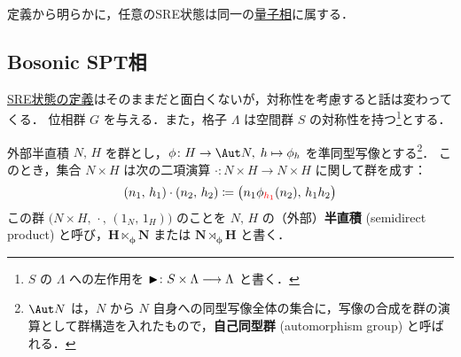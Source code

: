 \documentclass[TQFT_main]{subfiles}
\begin{document}
定義から明らかに，任意のSRE状態は同一の\hyperref[def:quantum-phase]{量子相}に属する．

\subsection{Bosonic SPT相}

\hyperref[def:SRE]{SRE状態の定義}はそのままだと面白くないが，対称性を考慮すると話は変わってくる．
位相群 $G$ を与える．また，格子 $\Lambda$ は空間群 $S$ の対称性を持つ\footnote{$S$ の $\Lambda$ への左作用を $\blacktriangleright \colon S \times \Lambda \longrightarrow \Lambda$ と書く．}とする．

\begin{mydef}[label=def:semiprod-group-inner]{外部半直積}
	$N,\, H$ を群とし，$\phi \colon H \to \Aut N,\; h \mapsto \phi_h$ を準同型写像とする\footnote{$\Aut N$ は，$N$ から $N$ 自身への同型写像全体の集合に，写像の合成を群の演算として群構造を入れたもので，\textbf{自己同型群} (automorphism group) と呼ばれる．}．
	このとき，集合 $N \times H$ は次の二項演算 $\cdot \mathrel{} \colon N\times H \to N\times H$ に関して群を成す：
	\begin{align}
		(n_1,\, h_1) \cdot (n_2,\, h_2) \coloneqq \bigl( n_1 \phi_{\textcolor{red}{h_1}}(n_2),\, h_1h_2 \bigr) 
	\end{align}
	この群 $\bigl( N \times H,\, \cdot \mathrel{},\, (1_N,\, 1_H) \bigr)$ のことを $N,\, H$ の（外部）\textbf{半直積} (semidirect product) と呼び，$\bm{H \ltimes_\phi N}$ または $\bm{N \rtimes_\phi H}$ と書く．
\end{mydef}
\end{document}
